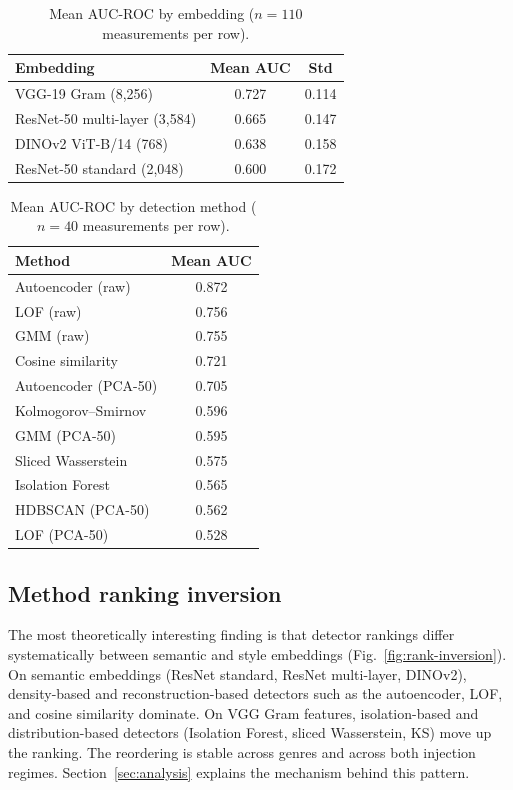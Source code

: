 \documentclass[conference]{IEEEtran}
\begin{document}
\begin{table}[t]
\caption{Mean AUC-ROC by embedding ($n{=}110$ measurements per row).}
\label{tab:embedding-rank}
\centering
\begin{tabular}{lcc}
\toprule
\textbf{Embedding} & \textbf{Mean AUC} & \textbf{Std} \\
\midrule
VGG-19 Gram (8{,}256) & 0.727 & 0.114 \\
ResNet-50 multi-layer (3{,}584) & 0.665 & 0.147 \\
DINOv2 ViT-B/14 (768) & 0.638 & 0.158 \\
ResNet-50 standard (2{,}048) & 0.600 & 0.172 \\
\bottomrule
\end{tabular}
\end{table}

\begin{table}[t]
\caption{Mean AUC-ROC by detection method ($n{=}40$ measurements per row).}
\label{tab:method-rank}
\centering
\begin{tabular}{lc}
\toprule
\textbf{Method} & \textbf{Mean AUC} \\
\midrule
Autoencoder (raw)        & 0.872 \\
LOF (raw)                & 0.756 \\
GMM (raw)                & 0.755 \\
Cosine similarity        & 0.721 \\
Autoencoder (PCA-50)     & 0.705 \\
Kolmogorov--Smirnov      & 0.596 \\
GMM (PCA-50)             & 0.595 \\
Sliced Wasserstein       & 0.575 \\
Isolation Forest         & 0.565 \\
HDBSCAN (PCA-50)         & 0.562 \\
LOF (PCA-50)             & 0.528 \\
\bottomrule
\end{tabular}
\end{table}

\subsection{Method ranking inversion}
\label{sec:rank-inversion}

The most theoretically interesting finding is that detector rankings differ systematically between semantic and style embeddings (Fig.~\ref{fig:rank-inversion}). On semantic embeddings (ResNet standard, ResNet multi-layer, DINOv2), density-based and reconstruction-based detectors such as the autoencoder, LOF, and cosine similarity dominate. On VGG Gram features, isolation-based and distribution-based detectors (Isolation Forest, sliced Wasserstein, KS) move up the ranking. The reordering is stable across genres and across both injection regimes. Section~\ref{sec:analysis} explains the mechanism behind this pattern.
\end{document}
